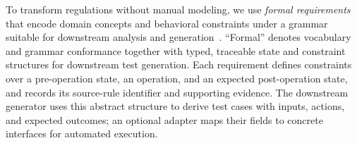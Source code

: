 






To transform regulations without manual modeling, we use \emph{formal
requirements} that encode domain concepts and behavioral constraints under a
grammar suitable for downstream analysis and generation~\cite{gropler2021nlp,yang2025requirements}.
``Formal'' denotes vocabulary and grammar conformance together with typed,
traceable state and constraint structures for downstream test generation. Each
requirement defines constraints over a pre-operation state, an operation, and
an expected post-operation state, and records its source-rule identifier and
supporting evidence. The downstream generator uses this abstract structure to
derive test cases with inputs, actions, and expected outcomes; an optional
adapter maps their fields to concrete interfaces for automated execution.

